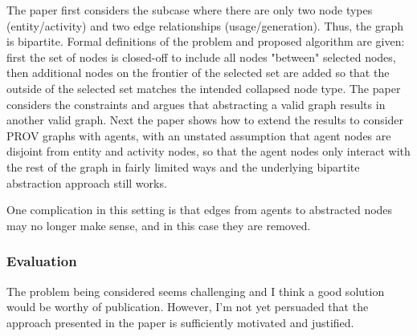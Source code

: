 \documentclass{article}
\newcommand{\showComments}{yes} %
\newcommand{\com}[2]{\ifthenelse{\equal{\showComments}{yes}}{\textcolor{#1}{#2}}{}}
\newcommand{\comment}[1]{\com{red}{#1}}
\begin{document}
The paper first considers the subcase where there are only two node types (entity/activity) and two edge relationships (usage/generation). Thus, the graph is bipartite.  Formal definitions of the problem and proposed algorithm are given: first the set of nodes is closed-off to include all nodes "between" selected nodes, then additional nodes on the frontier of the selected set are added so that the outside of the selected set matches the intended collapsed node type.  The paper considers the constraints and argues that abstracting a valid graph results in another valid graph.  Next the paper shows how to extend the results to consider PROV graphs with agents, with an unstated assumption that agent nodes are disjoint from entity and activity nodes, so that the agent nodes only interact with the rest of the graph in fairly limited ways and the underlying bipartite abstraction approach still works.


One complication in this setting is that edges from agents to abstracted nodes may no longer make sense, and in this case they are removed.

\subsubsection*{Evaluation}

The problem being considered seems challenging and I think a good solution would be worthy of publication.  However, I'm not yet persuaded that the approach presented in the paper is sufficiently motivated and justified.  
\end{document}
